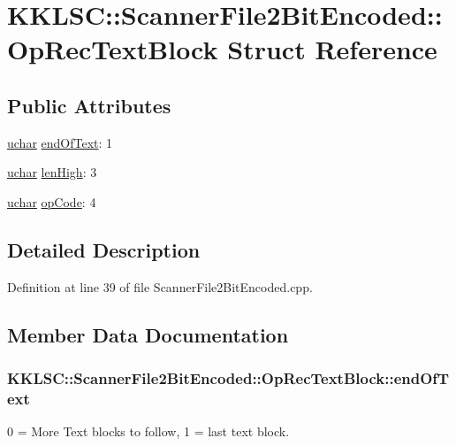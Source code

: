 \hypertarget{struct_scanner_file2_bit_encoded_1_1_op_rec_text_block}{}\section{K\+K\+L\+SC\+:\+:Scanner\+File2\+Bit\+Encoded\+:\+:Op\+Rec\+Text\+Block Struct Reference}
\label{struct_scanner_file2_bit_encoded_1_1_op_rec_text_block}
\subsection*{Public Attributes}
\begin{DoxyCompactItemize}
\item 
\hyperlink{namespace_k_k_b_ace9969169bf514f9ee6185186949cdf7}{uchar} \hyperlink{struct_scanner_file2_bit_encoded_1_1_op_rec_text_block_a7e599574692d65e91b07a46298a2decd}{end\+Of\+Text}\+: 1
\item 
\hyperlink{namespace_k_k_b_ace9969169bf514f9ee6185186949cdf7}{uchar} \hyperlink{struct_scanner_file2_bit_encoded_1_1_op_rec_text_block_a8492087b806d5c17e43c2110210461e6}{len\+High}\+: 3
\item 
\hyperlink{namespace_k_k_b_ace9969169bf514f9ee6185186949cdf7}{uchar} \hyperlink{struct_scanner_file2_bit_encoded_1_1_op_rec_text_block_a6fb01ee0c32a5a3d530506ae0dc4d306}{op\+Code}\+: 4
\end{DoxyCompactItemize}


\subsection{Detailed Description}


Definition at line 39 of file Scanner\+File2\+Bit\+Encoded.\+cpp.



\subsection{Member Data Documentation}
\subsubsection[{\texorpdfstring{end\+Of\+Text}{endOfText}}]{ K\+K\+L\+S\+C\+::\+Scanner\+File2\+Bit\+Encoded\+::\+Op\+Rec\+Text\+Block\+::end\+Of\+Text}\hypertarget{struct_scanner_file2_bit_encoded_1_1_op_rec_text_block_a7e599574692d65e91b07a46298a2decd}{}\label{struct_scanner_file2_bit_encoded_1_1_op_rec_text_block_a7e599574692d65e91b07a46298a2decd}
0 = More Text blocks to follow, 1 = last text block. 

